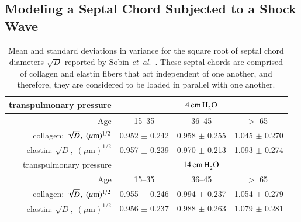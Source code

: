\subsection{Modeling a Septal Chord Subjected to a Shock Wave}

\begin{table}
    \centering
    \begin{tabular}{|r|ccc|} 
        \hline 
        transpulmonary pressure &
        \multicolumn{3}{|c|}{$4 \, \mathrm{cm} \, \mathrm{H}_2^{\vphantom{|}} \mathrm{O}$} \\ 
        \hline
        Age & 15--35 & 36--45 & $>$ 65 $\vphantom{|}^{\vphantom{|}}$ \\ \hline 
        collagen: $\sqrt{D}^{\vphantom{|}}, \; ( \mu \textrm{m} )^{1/2}$ & 
        0.952 $\pm$ 0.242 & 0.958 $\pm$ 0.255 & 1.045 $\pm$ 0.270 \\
        elastin: $\sqrt{D}, \; ( \mu \textrm{m} )^{1/2}$ & 
        0.957 $\pm$ 0.239 & 0.970 $\pm$ 0.213 & 1.093 $\pm$ 0.274 \\
        \hline\hline       
        transpulmonary pressure &
        \multicolumn{3}{|c|}{$14 \, \mathrm{cm} \, \mathrm{H}_2^{\vphantom{|}} \mathrm{O}$} \\ 
        \hline
        Age & 15--35 & 36--45 & $>$ 65 $\vphantom{|}^{\vphantom{|}}$ \\ \hline 
        collagen: $\sqrt{D}^{\vphantom{|}}, \; ( \mu \textrm{m} )^{1/2}$ & 
        0.955 $\pm$ 0.246 & 0.994 $\pm$ 0.237 & 1.054 $\pm$ 0.279 \\
        elastin: $\sqrt{D}, \; ( \mu \textrm{m} )^{1/2}$ & 
        0.956 $\pm$ 0.237 & 0.988 $\pm$ 0.263 & 1.079 $\pm$ 0.281 \\
        \hline
    \end{tabular}
    \caption{\label{tab:alveolarProp}
        Mean and standard deviations in variance for the square root of septal chord diameters $\sqrt{D}$ reported by Sobin \textit{et~al}.\ \cite{Sobinetal88}.  These septal chords are comprised of collagen and elastin fibers that act independent of one another, and therefore, they are considered to be loaded in parallel with one another.}
\end{table}

